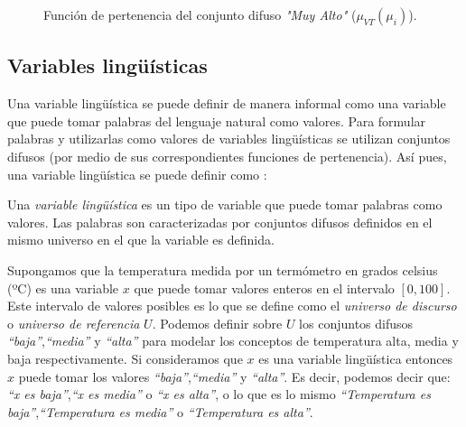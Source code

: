 \begin{figure}[t]
	\centering
	\newlength\figureheight 
	\newlength\figurewidth
	\setlength\figureheight{4.5cm}
	\setlength\figurewidth{12cm}
	
	\caption{Función de pertenencia del conjunto difuso \emph{"Muy Alto"} ($\mu_{VT}(\mu_{i})$).}
	\label{fig:fuzzyset-verytall-example}
\end{figure}

\subsection{Variables lingüísticas}
Una variable lingüística se puede definir de manera informal como una variable que puede tomar palabras del lenguaje natural como valores. Para formular palabras y utilizarlas como valores de variables lingüísticas se utilizan conjuntos difusos (por medio de sus correspondientes funciones de pertenencia). Así pues, una variable lingüística se puede definir como \cite{wang1997}:

\begin{definition}
Una \emph{variable lingüística} es un tipo de variable que puede tomar palabras como valores. Las palabras son caracterizadas por conjuntos difusos definidos en el mismo universo en el que la variable es definida.
\end{definition}

\begin{example}\label{ex:lang-variable}
\normalfont
Supongamos que la temperatura medida por un termómetro en grados celsius (ºC) es una variable $x$ que puede tomar valores enteros en el intervalo $[0,100]$. Este intervalo de valores posibles es lo que se define como el \emph{universo de discurso} o \emph{universo de referencia} $U$. Podemos definir sobre $U$ los conjuntos difusos \emph{``baja''},\emph{``media''} y \emph{``alta''} para modelar los conceptos de temperatura alta, media y baja respectivamente. Si consideramos que $x$ es una variable lingüística entonces $x$ puede tomar los valores \emph{``baja''},\emph{``media''} y \emph{``alta''}. Es decir, podemos decir que: \emph{``x es baja''},\emph{``x es media''} o \emph{``x es alta''}, o lo que es lo mismo \emph{``Temperatura es baja''},\emph{``Temperatura es media''} o \emph{``Temperatura es alta''}.
\end{example}

